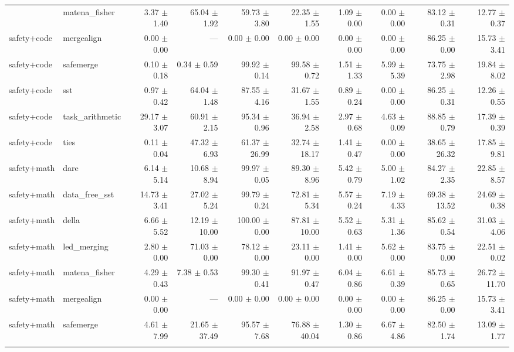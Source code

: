 \begin{table}[H]
{\begin{tabular}{llrrrrrrrr}
{safety+code & matena\_fisher & 3.37 $\pm$ 1.40 & 65.04 $\pm$ 1.92 & 59.73 $\pm$ 3.80 & 22.35 $\pm$ 1.55 & 1.09 $\pm$ 0.00 & 0.00 $\pm$ 0.00 & 83.12 $\pm$ 0.31 & 12.77 $\pm$ 0.37 \\
safety+code & mergealign & 0.00 $\pm$ 0.00 & --- & 0.00 $\pm$ 0.00 & 0.00 $\pm$ 0.00 & 0.00 $\pm$ 0.00 & 0.00 $\pm$ 0.00 & 86.25 $\pm$ 0.00 & 15.73 $\pm$ 3.41 \\
safety+code & safemerge & 0.10 $\pm$ 0.18 & 0.34 $\pm$ 0.59 & 99.92 $\pm$ 0.14 & 99.58 $\pm$ 0.72 & 1.51 $\pm$ 1.33 & 5.99 $\pm$ 5.39 & 73.75 $\pm$ 2.98 & 19.84 $\pm$ 8.02 \\
safety+code & sst & 0.97 $\pm$ 0.42 & 64.04 $\pm$ 1.48 & 87.55 $\pm$ 4.16 & 31.67 $\pm$ 1.55 & 0.89 $\pm$ 0.24 & 0.00 $\pm$ 0.00 & 86.25 $\pm$ 0.31 & 12.26 $\pm$ 0.55 \\
safety+code & task\_arithmetic & 29.17 $\pm$ 3.07 & 60.91 $\pm$ 2.15 & 95.34 $\pm$ 0.96 & 36.94 $\pm$ 2.58 & 2.97 $\pm$ 0.68 & 4.63 $\pm$ 0.09 & 88.85 $\pm$ 0.79 & 17.39 $\pm$ 0.39 \\
safety+code & ties & 0.11 $\pm$ 0.04 & 47.32 $\pm$ 6.93 & 61.37 $\pm$ 26.99 & 32.74 $\pm$ 18.17 & 1.41 $\pm$ 0.47 & 0.00 $\pm$ 0.00 & 38.65 $\pm$ 26.32 & 17.85 $\pm$ 9.81 \\
safety+math & dare & 6.14 $\pm$ 5.14 & 10.68 $\pm$ 8.94 & 99.97 $\pm$ 0.05 & 89.30 $\pm$ 8.96 & 5.42 $\pm$ 0.79 & 5.00 $\pm$ 1.02 & 84.27 $\pm$ 2.35 & 22.85 $\pm$ 8.57 \\
safety+math & data\_free\_sst & 14.73 $\pm$ 3.41 & 27.02 $\pm$ 5.24 & 99.79 $\pm$ 0.24 & 72.81 $\pm$ 5.34 & 5.57 $\pm$ 0.24 & 7.19 $\pm$ 4.33 & 69.38 $\pm$ 13.52 & 24.69 $\pm$ 0.38 \\
safety+math & della & 6.66 $\pm$ 5.52 & 12.19 $\pm$ 10.00 & 100.00 $\pm$ 0.00 & 87.81 $\pm$ 10.00 & 5.52 $\pm$ 0.63 & 5.31 $\pm$ 1.36 & 85.62 $\pm$ 0.54 & 31.03 $\pm$ 4.06 \\
safety+math & led\_merging & 2.80 $\pm$ 0.00 & 71.03 $\pm$ 0.00 & 78.12 $\pm$ 0.00 & 23.11 $\pm$ 0.00 & 1.41 $\pm$ 0.00 & 5.62 $\pm$ 0.00 & 83.75 $\pm$ 0.00 & 22.51 $\pm$ 0.02 \\
safety+math & matena\_fisher & 4.29 $\pm$ 0.43 & 7.38 $\pm$ 0.53 & 99.30 $\pm$ 0.41 & 91.97 $\pm$ 0.47 & 6.04 $\pm$ 0.86 & 6.61 $\pm$ 0.39 & 85.73 $\pm$ 0.65 & 26.72 $\pm$ 11.70 \\
safety+math & mergealign & 0.00 $\pm$ 0.00 & --- & 0.00 $\pm$ 0.00 & 0.00 $\pm$ 0.00 & 0.00 $\pm$ 0.00 & 0.00 $\pm$ 0.00 & 86.25 $\pm$ 0.00 & 15.73 $\pm$ 3.41 \\
safety+math & safemerge & 4.61 $\pm$ 7.99 & 21.65 $\pm$ 37.49 & 95.57 $\pm$ 7.68 & 76.88 $\pm$ 40.04 & 1.30 $\pm$ 0.86 & 6.67 $\pm$ 4.86 & 82.50 $\pm$ 1.74 & 13.09 $\pm$ 1.77 \\
}
\end{tabular}}
\end{table}
